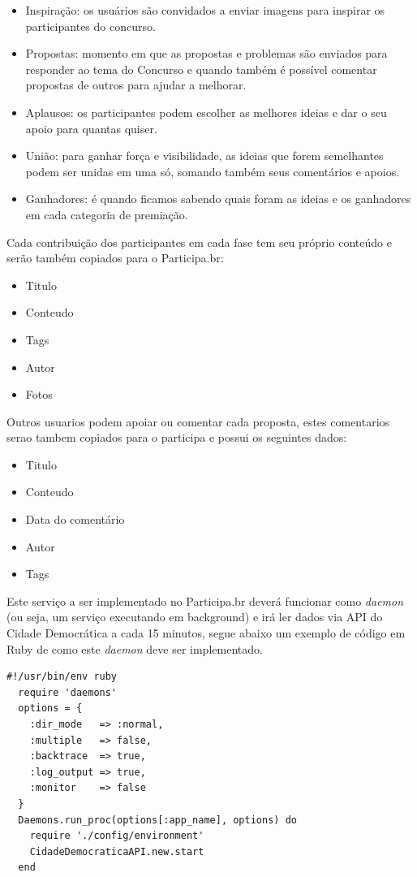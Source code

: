 \documentclass[12pt]{article}
\begin{document}
\begin{itemize}
  \item Inspiração: os usuários são convidados a enviar imagens para inspirar os participantes do concurso.
  \item Propostas: momento em que as propostas e problemas são enviados para responder ao tema do Concurso e quando também é possível comentar propostas de outros para ajudar a melhorar.
  \item Aplausos: os participantes podem escolher as melhores ideias e dar o seu apoio para quantas quiser.
  \item União: para ganhar força e visibilidade, as ideias que forem semelhantes podem ser unidas em uma só, somando também seus comentários e apoios.
  \item Ganhadores: é quando ficamos sabendo quais foram as ideias e os ganhadores em cada categoria de premiação.
\end{itemize}

Cada contribuição dos participantes em cada fase tem seu próprio conteúdo e
serão também copiados para o Participa.br:

\begin{itemize}
  \item Titulo
  \item Conteudo
  \item Tags
  \item Autor
  \item Fotos
\end{itemize}

Outros usuarios podem apoiar ou comentar cada proposta, estes comentarios
serao tambem copiados para o participa e possui os seguintes dados:

\begin{itemize}
  \item Titulo
  \item Conteudo
  \item Data do comentário
  \item Autor
  \item Tags
\end{itemize}

Este serviço a ser implementado no Participa.br deverá funcionar como {\it
daemon} (ou seja, um serviço executando em background) e irá ler dados via API
do Cidade Democrática a cada 15 minutos, segue abaixo um exemplo de código em
Ruby de como este {\it daemon} deve ser implementado.

\begin{framed}
\begin{lstlisting}[caption=Exemplo de código Ruby para o daemon]
  #!/usr/bin/env ruby
  require 'daemons'
  options = {
    :dir_mode   => :normal,
    :multiple   => false,
    :backtrace  => true,
    :log_output => true,
    :monitor    => false
  }
  Daemons.run_proc(options[:app_name], options) do
    require './config/environment'
    CidadeDemocraticaAPI.new.start
  end
\end{lstlisting}
\end{framed}
\end{document}
